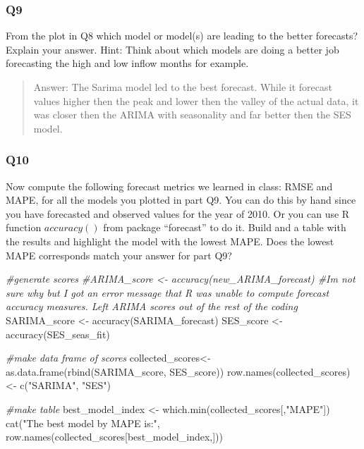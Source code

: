 \documentclass[
]{article}
\newenvironment{Shaded}{\begin{snugshade}}{\end{snugshade}}
\newcommand{\CommentTok}[1]{\textcolor[rgb]{0.56,0.35,0.01}{\textit{#1}}}
\newcommand{\FunctionTok}[1]{\textcolor[rgb]{0.00,0.00,0.00}{#1}}
\newcommand{\NormalTok}[1]{#1}
\newcommand{\OtherTok}[1]{\textcolor[rgb]{0.56,0.35,0.01}{#1}}
\newcommand{\StringTok}[1]{\textcolor[rgb]{0.31,0.60,0.02}{#1}}
\begin{document}
\hypertarget{q9}{%
\subsubsection{Q9}\label{q9}}

From the plot in Q8 which model or model(s) are leading to the better
forecasts? Explain your answer. Hint: Think about which models are doing
a better job forecasting the high and low inflow months for example.

\begin{quote}
Answer: The Sarima model led to the best forecast. While it forecast
values higher then the peak and lower then the valley of the actual
data, it was closer then the ARIMA with seasonality and far better then
the SES model.
\end{quote}

\hypertarget{q10}{%
\subsubsection{Q10}\label{q10}}

Now compute the following forecast metrics we learned in class: RMSE and
MAPE, for all the models you plotted in part Q9. You can do this by hand
since you have forecasted and observed values for the year of 2010. Or
you can use R function \(accuracy()\) from package ``forecast'' to do
it. Build and a table with the results and highlight the model with the
lowest MAPE. Does the lowest MAPE corresponds match your answer for part
Q9?

\begin{Shaded}
\begin{Highlighting}[]
\CommentTok{\#generate scores}
\CommentTok{\#ARIMA\_score \textless{}{-} accuracy(new\_ARIMA\_forecast) \#I\textquotesingle{}m not sure why but I got an error message that R was unable to compute forecast accuracy measures. Left ARIMA scores out of the rest of the coding}
\NormalTok{SARIMA\_score }\OtherTok{\textless{}{-}} \FunctionTok{accuracy}\NormalTok{(SARIMA\_forecast)}
\NormalTok{SES\_score }\OtherTok{\textless{}{-}} \FunctionTok{accuracy}\NormalTok{(SES\_seas\_fit)}

\CommentTok{\#make data frame of scores}
\NormalTok{collected\_scores}\OtherTok{\textless{}{-}}\FunctionTok{as.data.frame}\NormalTok{(}\FunctionTok{rbind}\NormalTok{(SARIMA\_score, SES\_score))}
\FunctionTok{row.names}\NormalTok{(collected\_scores) }\OtherTok{\textless{}{-}} \FunctionTok{c}\NormalTok{(}\StringTok{"SARIMA"}\NormalTok{, }\StringTok{"SES"}\NormalTok{)}

\CommentTok{\#make table}
\NormalTok{best\_model\_index }\OtherTok{\textless{}{-}} \FunctionTok{which.min}\NormalTok{(collected\_scores[,}\StringTok{"MAPE"}\NormalTok{])}
\FunctionTok{cat}\NormalTok{(}\StringTok{"The best model by MAPE is:"}\NormalTok{, }\FunctionTok{row.names}\NormalTok{(collected\_scores[best\_model\_index,])) }
\end{Highlighting}
\end{Shaded}
\end{document}
